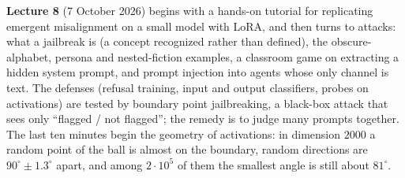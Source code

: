 \textbf{Lecture 8} (7 October 2026) begins with a hands-on tutorial for replicating emergent misalignment on a small model with LoRA, and then turns to attacks: what a jailbreak is (a concept recognized rather than defined), the obscure-alphabet, persona and nested-fiction examples, a classroom game on extracting a hidden system prompt, and prompt injection into agents whose only channel is text. The defenses (refusal training, input and output classifiers, probes on activations) are tested by boundary point jailbreaking, a black-box attack that sees only ``flagged / not flagged''; the remedy is to judge many prompts together. The last ten minutes begin the geometry of activations: in dimension $2000$ a random point of the ball is almost on the boundary, random directions are $90^\circ\pm1.3^\circ$ apart, and among $2\cdot10^5$ of them the smallest angle is still about $81^\circ$.


